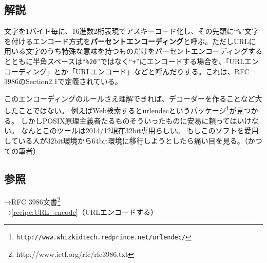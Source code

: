 \subsection*{解説}
文字を1バイト毎に、16進数2桁表現でアスキーコード化し、その先頭に``\verb|%|''文字を付けるエンコード方式を\textbf{パーセントエンコーディング}と呼ぶ。ただしURLに用いる文字のうち特殊な意味を持つものだけをパーセントエンコーディングするとともに半角スペースは``\verb|%20|''ではなく``\verb|+|''にエンコードする場合を、「URLエンコーディング」とか「URLエンコード」などと呼んだりする。これは、RFC 3986のSection2.1で定義されている。

このエンコーディングのルールさえ理解できれば、デコーダーを作ることなど大したことではない。
例えばWeb検索するとurlendecというパッケージ\footnote{\verb|http://www.whizkidtech.redprince.net/urlendec/|}が見つかる。
しかしPOSIX原理主義者たるものそういったものに安易に頼ってはいけない。
なんとこのツールは2014/12現在32bit専用らしい。
もしこのソフトを愛用している人が32bit環境から64bit環境に移行しようとしたら痛い目を見る。（かつての筆者）

\subsection*{参照}

\noindent
→RFC 3986文書\footnote{http://www.ietf.org/rfc/rfc3986.txt} \\
→\ref{recipe:URL_encode}（URLエンコードする）
